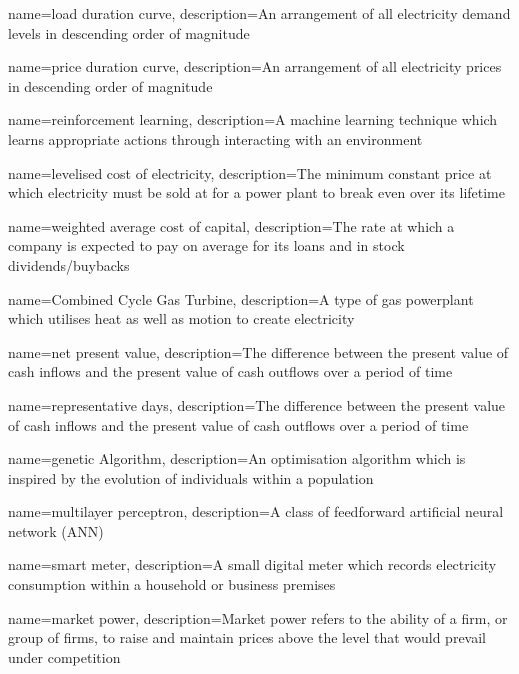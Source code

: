 {
	name=load duration curve,
	description={An arrangement of all electricity demand levels in descending order of magnitude}
}




{
	name=price duration curve,
	description={An arrangement of all electricity prices in descending order of magnitude}
}


{
	name=reinforcement learning,
	description={A machine learning technique which learns appropriate actions through interacting with an environment}
}



{
	name=levelised cost of electricity,
	description={The minimum constant price at which electricity must be sold at for a power plant to break even over its lifetime}
}



{
	name=weighted average cost of capital,
	description={The rate at which a company is expected to pay on average for its loans and in stock dividends/buybacks}
}


{
	name=Combined Cycle Gas Turbine,
	description={A type of gas powerplant which utilises heat as well as motion to create electricity}
}



{
	name=net present value,
	description={The difference between the present value of cash inflows and the present value of cash outflows over a period of time}
}


{
	name=representative days,
	description={The difference between the present value of cash inflows and the present value of cash outflows over a period of time}
}


{
	name=genetic Algorithm,
	description={An optimisation algorithm which is inspired by the evolution of individuals within a population}
}



{
	name=multilayer perceptron,
	description={A class of feedforward artificial neural network (ANN)}
}


{
	name=smart meter,
	description={A small digital meter which records electricity consumption within a household or business premises}
}

{
	name=market power,
	description={Market power refers to the ability of a firm, or group of firms, to raise and maintain prices above the level that would prevail under competition}
}


